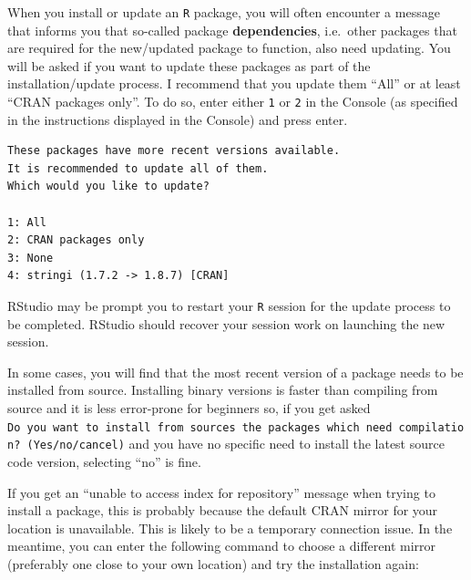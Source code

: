 \documentclass[
  letterpaper,
  DIV=11,
  numbers=noendperiod]{scrreprt}
\begin{document}
\begin{tcolorbox}[enhanced jigsaw, arc=.35mm, bottomrule=.15mm, bottomtitle=1mm, breakable, colback=white, colbacktitle=quarto-callout-note-color!10!white, colframe=quarto-callout-note-color-frame, coltitle=black, left=2mm, leftrule=.75mm, opacityback=0, opacitybacktitle=0.6, rightrule=.15mm, title=\textcolor{quarto-callout-note-color}{\faInfo}\hspace{0.5em}{Solving package installation problems \emoji{double-exclamation-mark}}, titlerule=0mm, toprule=.15mm, toptitle=1mm]

When you install or update an \texttt{R} package, you will often
encounter a message that informs you that so-called package
\textbf{dependencies}, i.e.~other packages that are required for the
new/updated package to function, also need updating. You will be asked
if you want to update these packages as part of the installation/update
process. I recommend that you update them ``All'' or at least ``CRAN
packages only''. To do so, enter either \texttt{1} or \texttt{2} in the
Console (as specified in the instructions displayed in the Console) and
press enter.

\begin{verbatim}
These packages have more recent versions available.
It is recommended to update all of them.
Which would you like to update?

1: All                            
2: CRAN packages only             
3: None                           
4: stringi (1.7.2 -> 1.8.7) [CRAN]
\end{verbatim}

RStudio may be prompt you to restart your \texttt{R} session for the
update process to be completed. RStudio should recover your session work
on launching the new session.

In some cases, you will find that the most recent version of a package
needs to be installed from source. Installing binary versions is faster
than compiling from source and it is less error-prone for beginners so,
if you get asked
\texttt{Do\ you\ want\ to\ install\ from\ sources\ the\ packages\ which\ need\ compilation?\ (Yes/no/cancel)}
and you have no specific need to install the latest source code version,
selecting ``no'' is fine.

If you get an ``unable to access index for repository'' message when
trying to install a package, this is probably because the default CRAN
mirror for your location is unavailable. This is likely to be a
temporary connection issue. In the meantime, you can enter the following
command to choose a different mirror (preferably one close to your own
location) and try the installation again:


\end{tcolorbox}
\end{document}
